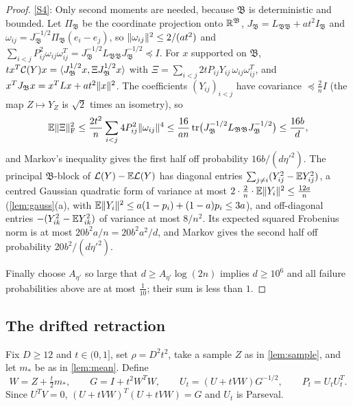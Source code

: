 \begin{proof}
\ref{S4}: Only second moments are needed, because $\mathfrak B$ is deterministic
and bounded. Let $\Pi_{\mathfrak B}$ be the coordinate projection onto
$\mathbb R^{\mathfrak B}$, $J_{\mathfrak B}=L_{\mathfrak B\mathfrak B}+at^2I_{\mathfrak B}$
and $\omega_{ij}=J_{\mathfrak B}^{-1/2}\Pi_{\mathfrak B}(e_i-e_j)$, so
$\lVert \omega_{ij}\rVert^2\le2/(at^2)$ and
$\sum_{i<j}P_{ij}^2\omega_{ij}\omega_{ij}^T=J_{\mathfrak B}^{-1/2}L_{\mathfrak
B\mathfrak B}J_{\mathfrak B}^{-1/2}\preceq I$. For $x$ supported on $\mathfrak
B$, $tx^T\mathcal C(Y)x=\langle J_{\mathfrak B}^{1/2}x,\Xi J_{\mathfrak B}^{1/2}x\rangle$
with $\Xi=\sum_{i<j}2tP_{ij}Y_{ij}\,\omega_{ij}\omega_{ij}^T$, and
$x^TJ_{\mathfrak B}x=x^TLx+at^2\lVert x\rVert^2$. The coefficients $(Y_{ij})_{i<j}$
have covariance $\preceq\frac2nI$ (the map $Z\mapsto Y_Z$ is $\sqrt2$ times an
isometry), so
\[
 \mathbb E\lVert \Xi\rVert_{\mathrm F}^2\le\frac{2t^2}n\sum_{i<j}4P_{ij}^2\lVert \omega_{ij}\rVert^4
 \le\frac{16}{an}\operatorname{tr}\bigl(J_{\mathfrak B}^{-1/2}L_{\mathfrak B\mathfrak B}
 J_{\mathfrak B}^{-1/2}\bigr)\le\frac{16b}d ,
\]
and Markov's inequality gives the first half off probability $16b/(d\eta'^2)$.
The principal $\mathfrak B$-block of $\mathcal L(Y)-\mathbb E\mathcal L(Y)$ has diagonal entries
$\sum_{j\ne i}(Y_{ij}^2-\mathbb E Y_{ij}^2)$, a centred Gaussian quadratic form of
variance at most $2\cdot\frac2n\cdot\mathbb E\lVert Y_i\rVert^2\le\frac{12a}n$
(\cref{lem:gauss}(a), with $\mathbb E\lVert Y_i\rVert^2\le a(1-p_i)+(1-a)p_i\le3a$), and
off-diagonal entries $-(Y_{ik}^2-\mathbb E Y_{ik}^2)$ of variance at most $8/n^2$. Its
expected squared Frobenius norm is at most $20b^2a/n=20b^2a^2/d$, and Markov
gives the second half off probability $20b^2/(d\eta'^2)$.

Finally choose $A_{\eta'}$ so large that $d\ge A_{\eta'}\log(2n)$ implies
$d\ge10^6$ and all failure probabilities above are at most $\frac1{10}$; their
sum is less than $1$.
\end{proof}

\subsection{The drifted retraction}

Fix $D\ge12$ and $t\in(0,1]$, set $\rho=D^2t^2$, take a sample $Z$ as in
\cref{lem:sample}, and let $m_*$ be as in \cref{lem:mean}. Define
\[
 W=Z+\tfrac t2m_*,\qquad G=I+t^2W^TW,\qquad U_t=(U+tVW)G^{-1/2},\qquad
 P_t=U_tU_t^T .
\]
Since $U^TV=0$, $(U+tVW)^T(U+tVW)=G$ and $U_t$ is Parseval.

